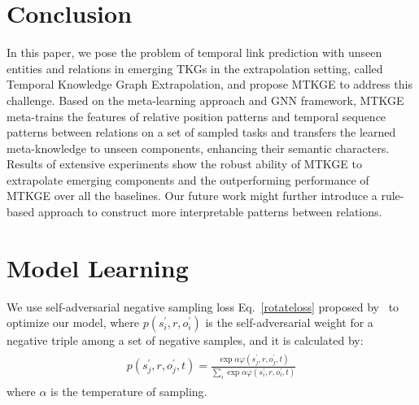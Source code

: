 \documentclass[sigconf]{acmart}
\begin{document}
\section{Conclusion}
\par
In this paper, we pose the problem of temporal link prediction with unseen entities and relations in emerging TKGs in the extrapolation setting, called Temporal Knowledge Graph Extrapolation, and propose MTKGE to address this challenge.
Based on the meta-learning approach and GNN framework, MTKGE meta-trains the features of relative position patterns and temporal sequence patterns between relations on a set of sampled tasks and transfers the learned meta-knowledge to unseen components, enhancing their semantic characters. 
Results of extensive experiments show the robust  ability of MTKGE to extrapolate emerging components and the outperforming performance of MTKGE over all the baselines. 
Our future work might further introduce a rule-based approach to construct more interpretable patterns between relations.








\newpage
\appendix
\section{Model Learning}
\label{loss}
We use self-adversarial negative sampling loss Eq.~\ref{rotateloss} proposed by~\citep{RotatE} to optimize our model, where $p\left(s_{i}^{\prime}, r, o_{i}^{\prime}\right)$ is the self-adversarial weight for a negative
triple among a set of negative samples, and it is calculated by:
\begin{equation}
\begin{aligned}
\begin{split}
p\left(s_{j}^{\prime}, r, o_{j}^{\prime},t\right)=\frac{\exp \alpha \varphi\left(s_{j}^{\prime}, r, o_{j}^{\prime},t\right)}{\sum_{i} \exp \alpha \varphi\left(s_{i}^{\prime}, r, o_{i}^{\prime},t\right)}
\end{split}
\end{aligned}
\end{equation}
where $\alpha$ is the temperature of sampling.
\end{document}
